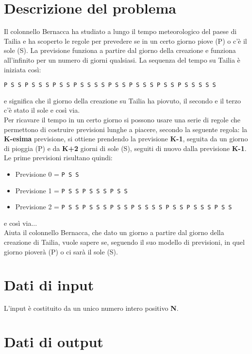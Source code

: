 \documentclass[a4paper,11pt]{article}
\begin{document}
\vspace{0.5cm}



\section*{Descrizione del problema}

Il colonnello Bernacca ha studiato a lungo il tempo meteorologico del paese di Tailia e ha scoperto le regole per prevedere se in un certo giorno piove (P) o c’è il sole (S). La previsione funziona a partire dal giorno della creazione e funziona all’infinito per un numero di giorni qualsiasi. La sequenza del tempo su Tailia è iniziata così:
\begin{verbatim}
P S S P S S S P S S P S S S S P S S P S S S P S S P S S S S S 
\end{verbatim}
\noindent
e significa che il giorno della creazione su Tailia ha piovuto, il secondo e il terzo c’è stato il sole e così via.\\
Per ricavare il tempo in un certo giorno si possono usare una serie di regole che permettono di costruire previsioni lunghe a piacere, secondo la seguente regola: la \textbf{K-esima} previsione, si ottiene prendendo la previsione \textbf{K-1}, seguita da un giorno di pioggia (P) e da \textbf{K+2} giorni di sole (S), seguiti di nuovo dalla previsione \textbf{K-1}.\\
Le prime previsioni risultano quindi:
\begin{itemize}
\item Previsione 0 = \texttt{P S S} 
\item Previsione 1 = \texttt{P S S P S S S P S S}
\item Previsione 2 = \texttt{P S S P S S S P S S P S S S S P S S P S S S P S S}
\end{itemize}
e così via...\\
Aiuta il colonnello Bernacca, che dato un giorno a partire dal giorno della creazione di Tailia, vuole sapere se, seguendo il suo modello di previsioni, in quel giorno pioverà (P) o ci sarà il sole (S).


\section*{Dati di input}
L'input è costituito da un unico numero intero positivo \textbf{N}.


\section*{Dati di output}
  
\end{document}
